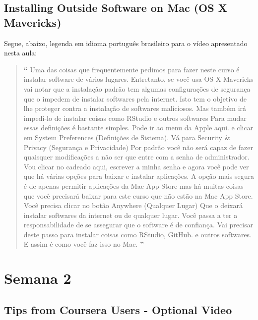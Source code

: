 \subsection{Installing Outside Software on Mac (OS X Mavericks)}

Segue, abaixo, legenda em idioma português brasileiro para o vídeo apresentado nesta aula:

\begin{quotation}%
\begin{small}
{\large\textbf{``}}%
Uma das coisas que frequentemente pedimos para fazer neste curso é instalar software de vários lugares. Entretanto, se você usa OS X Mavericks vai notar que a instalação padrão tem algumas configurações de segurança que o impedem de instalar softwares pela internet. Isto tem o objetivo de lhe proteger contra a instalação de softwares maliciosos. Mas também irá impedi-lo de instalar coisas como RStudio e outros softwares Para mudar essas definições é bastante simples. Pode ir ao menu da Apple aqui. e clicar em System Preferences (Definições de Sistema). Vá para Security \& Privacy (Segurança e Privacidade) Por padrão você não será capaz de fazer quaisquer modificações  a não ser que entre com a senha de administrador. Vou clicar no cadeado aqui, escrever a minha senha e agora você pode ver que há várias opções para baixar e instalar aplicações. A opção mais segura é de apenas permitir aplicações da Mac App Store mas há muitas coisas que você precisará baixar para este curso que não estão na Mac App Store. Você precisa clicar no botão Anywhere (Qualquer Lugar) Que o deixará instalar softwares da internet ou de qualquer lugar. Você passa a ter a responsabilidade de se assegurar que o software é de confiança. Vai precisar deste passo para instalar coisas como RStudio, GitHub. e outros softwares. E assim é como você faz isso no Mac.
{\large\textbf{''}}
\end{small}
\end{quotation}


\section{Semana 2}

\subsection{Tips from Coursera Users - Optional Video}

